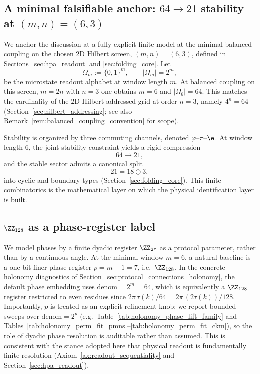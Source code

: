 \subsection{A minimal falsifiable anchor: \texorpdfstring{$64\to 21$}{64->21} stability at \texorpdfstring{$(m,n)=(6,3)$}{(m,n)=(6,3)}}
\label{subsec:minimal_anchor}

We anchor the discussion at a fully explicit finite model at the minimal balanced coupling on the chosen $2$D Hilbert screen, $(m,n)=(6,3)$, defined in Sections~\ref{sec:hpa_readout} and \ref{sec:folding_core}.
Let
\[
\Omega_m:=\{0,1\}^m,\qquad |\Omega_m|=2^m,
\]
be the microstate readout alphabet at window length $m$.
At balanced coupling on this screen, $m=2n$ with $n=3$ one obtains $m=6$ and $|\Omega_6|=64$.
This matches the cardinality of the $2$D Hilbert-addressed grid at order $n=3$, namely $4^n=64$ (Section~\ref{sec:hilbert_addressing}; see also Remark~\ref{rem:balanced_coupling_convention} for scope).

Stability is organized by three commuting channels, denoted $\varphi$--$\pi$--$\e$.
At window length $6$, the joint stability constraint yields a rigid compression
\[
64\to 21,
\]
and the stable sector admits a canonical split
\[
21=18\oplus 3,
\]
into cyclic and boundary types (Section~\ref{sec:folding_core}).
This finite combinatorics is the mathematical layer on which the physical identification layer is built.

\subsection{\texorpdfstring{$\ZZ_{128}$}{Z128} as a phase-register label}
\label{subsec:z128_label}

We model phases by a finite dyadic register $\ZZ_{2^p}$ as a protocol parameter, rather than by a continuous angle.
At the minimal window $m=6$, a natural baseline is a one-bit-finer phase register $p=m+1=7$, i.e.\ $\ZZ_{128}$.
In the concrete holonomy diagnostics of Section~\ref{sec:protocol_connections_holonomy}, the default phase embedding uses $\mathrm{denom}=2^m=64$, which is equivalently a $\ZZ_{128}$ register restricted to even residues since $2\pi\,\tau(k)/64=2\pi\,(2\tau(k))/128$.
Importantly, $p$ is treated as an explicit refinement knob: we report bounded sweeps over $\mathrm{denom}=2^p$ (e.g.\ Table~\ref{tab:holonomy_phase_lift_family} and Tables~\ref{tab:holonomy_perm_fit_pmns}--\ref{tab:holonomy_perm_fit_ckm}), so the role of dyadic phase resolution is auditable rather than assumed.
This is consistent with the stance adopted here that physical readout is fundamentally finite-resolution (Axiom~\ref{ax:readout_sequentiality} and Section~\ref{sec:hpa_readout}).

